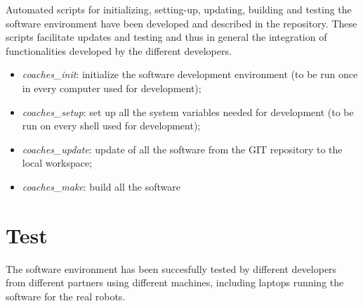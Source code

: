 \documentclass{article}
\begin{document}
Automated scripts for initializing, setting-up, updating, building and testing the software environment have been developed and described in the repository. These scripts facilitate updates and testing and thus in  general the integration of functionalities developed by the different developers.

\begin{itemize}
\item \emph{coaches\_init}: initialize the software development environment (to be run once in every computer used for development);
\item \emph{coaches\_setup}:   set up all the system variables needed for development (to be run on every shell used for development);
\item \emph{coaches\_update}:  update of all the software from the GIT repository to the local workspace;
\item \emph{coaches\_make}:   build all the software
\end{itemize}

\section{Test}

The software environment has been succesfully tested by different developers from different partners using different machines, including laptops running the software for the real robots.
\end{document}

